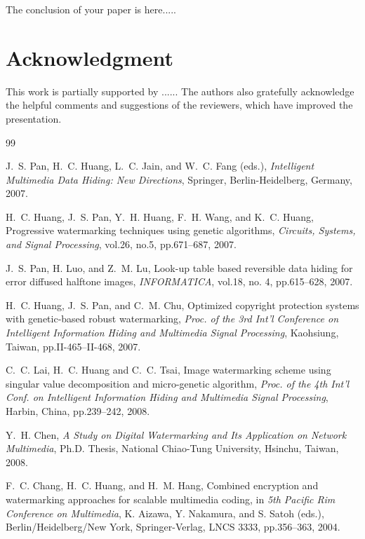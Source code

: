 \documentclass[12pt,a4paper]{jihmsp}
\begin{document}
	The conclusion of your paper is here.....
	
	\section*{Acknowledgment}
	This work is partially supported by ......
	The authors also gratefully acknowledge the helpful comments and suggestions of the reviewers,
	which have improved the presentation.
	
	
	
	
	
	\begin {thebibliography}{99}
	
	J.~S. Pan, H.~C. Huang, L.~C. Jain, and W.~C. Fang (eds.), {\em Intelligent Multimedia Data Hiding: New Directions}, Springer, Berlin-Heidelberg, Germany, 2007.
	
	H.~C. Huang, J.~S. Pan, Y.~H. Huang, F.~H. Wang, and K.~C. Huang,
	Progressive watermarking techniques using genetic algorithms,
	{\em Circuits, Systems, and Signal Processing}, vol.26, no.5, pp.671--687, 2007.
	
	J.~S. Pan, H. Luo, and Z.~M. Lu, Look-up table based reversible data hiding for error diffused halftone images, {\em INFORMATICA}, vol.18, no. 4, pp.615--628, 2007.
	
	H.~C. Huang, J.~S. Pan, and C.~M. Chu,
	Optimized copyright protection systems with genetic-based robust watermarking,
	{\em Proc. of the 3rd Int'l Conference on Intelligent Information Hiding and Multimedia Signal Processing}, Kaohsiung, Taiwan, pp.II-465--II-468, 2007.
	
	C.~C. Lai, H.~C. Huang and C.~C. Tsai,
	Image watermarking scheme using singular value decomposition and micro-genetic algorithm,
	{\em Proc. of the 4th Int'l Conf. on Intelligent Information Hiding and Multimedia Signal Processing}, Harbin, China, pp.239--242, 2008.
	
	Y.~H. Chen,
	{\em A Study on Digital Watermarking and Its Application on Network Multimedia},
	Ph.D. Thesis, National Chiao-Tung University, Hsinchu, Taiwan, 2008.
	
	F.~C. Chang, H.~C. Huang, and H.~M. Hang, Combined encryption and watermarking approaches for scalable multimedia coding, in {\em 5th Pacific Rim Conference on Multimedia},
	K. Aizawa, Y. Nakamura, and S. Satoh (eds.),
	Berlin/Heidelberg/New York, Springer-Verlag, LNCS 3333, pp.356--363, 2004.
	
\end{thebibliography}
\end{document}
